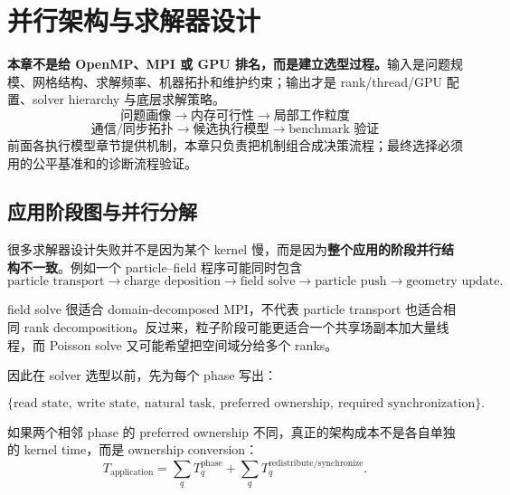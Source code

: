 \chapter{并行架构与求解器设计}
\label{ch:architecture}

\begin{keybox}
\textbf{本章不是给 OpenMP、MPI 或 GPU 排名，而是建立选型过程。}输入是问题规模、网格结构、求解频率、机器拓扑和维护约束；输出才是 rank/thread/GPU 配置、solver hierarchy 与底层求解策略。\[
\boxed{
\text{问题画像}\rightarrow\text{内存可行性}\rightarrow\text{局部工作粒度}
}
\]
\[
\boxed{
\text{通信/同步拓扑}\rightarrow\text{候选执行模型}\rightarrow\text{benchmark 验证}
}
\]
前面各执行模型章节提供机制，本章只负责把机制组合成决策流程；最终选择必须用的公平基准和的诊断流程验证。
\end{keybox}

\section{应用阶段图与并行分解}

很多求解器设计失败并不是因为某个 kernel 慢，而是因为\textbf{整个应用的阶段并行结构不一致}。例如一个 particle--field 程序可能同时包含
\begin{equation}
\text{particle transport}
\rightarrow
\text{charge deposition}
\rightarrow
\text{field solve}
\rightarrow
\text{particle push}
\rightarrow
\text{geometry update}.
\end{equation}

field solve 很适合 domain-decomposed MPI，不代表 particle transport 也适合相同 rank decomposition。反过来，粒子阶段可能更适合一个共享场副本加大量线程，而 Poisson solve 又可能希望把空间域分给多个 ranks。

因此在 solver 选型以前，先为每个 phase 写出：

\begin{equation}
\boxed{
\{\text{read state},\ \text{write state},\ \text{natural task},\ \text{preferred ownership},\ \text{required synchronization}\}.
}
\label{eq:architecture-phase-contract}
\end{equation}

如果两个相邻 phase 的 preferred ownership 不同，真正的架构成本不是各自单独的 kernel time，而是 ownership conversion：
\begin{equation}
T_{\mathrm{application}}
=
\sum_q T_q^{\mathrm{phase}}
+
\sum_q T_q^{\mathrm{redistribute/synchronize}}.
\label{eq:architecture-phase-total}
\end{equation}

